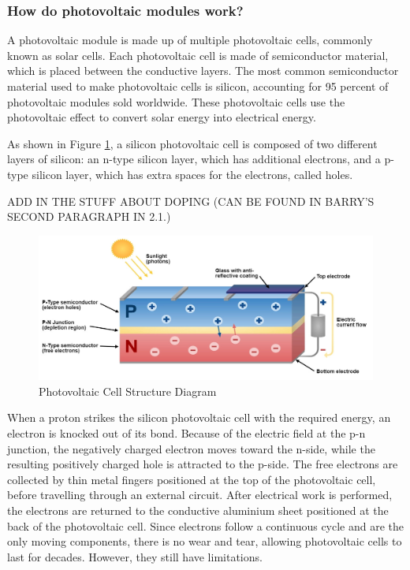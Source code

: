 \subsubsection{How do photovoltaic modules work?}
A photovoltaic module is made up of multiple photovoltaic cells, commonly known as solar cells. Each photovoltaic cell is made of semiconductor material, which is placed between the conductive layers. The most common semiconductor material used to make photovoltaic cells is silicon, accounting for 95 percent of photovoltaic modules sold worldwide. \cite{U.S.DEPARTMENTofENERGY2025SolarBasics} These photovoltaic cells use the photovoltaic effect to convert solar energy into electrical energy.\vspace{0.5em}

\noindent As shown in Figure \ref{fig:photovoltaic_cell_diagram}, a silicon photovoltaic cell is composed of two different layers of silicon: an n-type silicon layer, which has additional electrons, and a p-type silicon layer, which has extra spaces for the electrons, called holes.\par

\noindent ADD IN THE STUFF ABOUT DOPING (CAN BE FOUND IN BARRY'S SECOND PARAGRAPH IN 2.1.)

\begin{figure}[ht]
    \centering
    \includegraphics[width=1\textwidth]{Figures/photovoltaic_cell_diagram.jpg}
    \caption{Photovoltaic Cell Structure Diagram \cite{Gupta2020SolarVehicle}}
    \label{fig:photovoltaic_cell_diagram}
\end{figure}
\FloatBarrier

\noindent When a proton strikes the silicon photovoltaic cell with the required energy, an electron is knocked out of its bond. Because of the electric field at the p-n junction, the negatively charged electron moves toward the n-side, while the resulting positively charged hole is attracted to the p-side. The free electrons are collected by thin metal fingers positioned at the top of the photovoltaic cell, before travelling through an external circuit. After electrical work is performed, the electrons are returned to the conductive aluminium sheet positioned at the back of the photovoltaic cell. Since electrons follow a continuous cycle and are the only moving components, there is no wear and tear, allowing photovoltaic cells to last for decades. \cite{TED-Ed2025HowKomp} However, they still have limitations.\vspace{0.5em}

